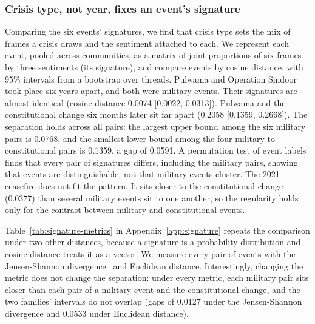 \subsubsection{Crisis type, not year, fixes an event's signature}
Comparing the six events' signatures, we find that crisis type sets the mix of frames a crisis draws and the sentiment attached to each. We represent each event, pooled across communities, as a matrix of joint proportions of six frames by three sentiments (its signature), and compare events by cosine distance, with 95\% intervals from a bootstrap over threads. Pulwama and Operation Sindoor took place six years apart, and both were military events. Their signatures are almost identical (cosine distance 0.0074 [0.0022, 0.0313]). Pulwama and the constitutional change six months later sit far apart (0.2058 [0.1359, 0.2668]). The separation holds across all pairs: the largest upper bound among the six military pairs is 0.0768, and the smallest lower bound among the four military-to-constitutional pairs is 0.1359, a gap of 0.0591. A permutation test of event labels finds that every pair of signatures differs, including the military pairs, showing that events are distinguishable, not that military events cluster. The 2021 ceasefire does not fit the pattern. It sits closer to the constitutional change (0.0377) than several military events sit to one another, so the regularity holds only for the contrast between military and constitutional events.

Table~\ref{tab:signature-metrics} in Appendix~\ref{app:signature} repeats the comparison under two other distances, because a signature is a probability distribution and cosine distance treats it as a vector. We measure every pair of events with the Jensen-Shannon divergence~\cite {lin1991divergence} and Euclidean distance. Interestingly, changing the metric does not change the separation: under every metric, each military pair sits closer than each pair of a military event and the constitutional change, and the two families' intervals do not overlap (gaps of 0.0127 under the Jensen-Shannon divergence and 0.0533 under Euclidean distance).

